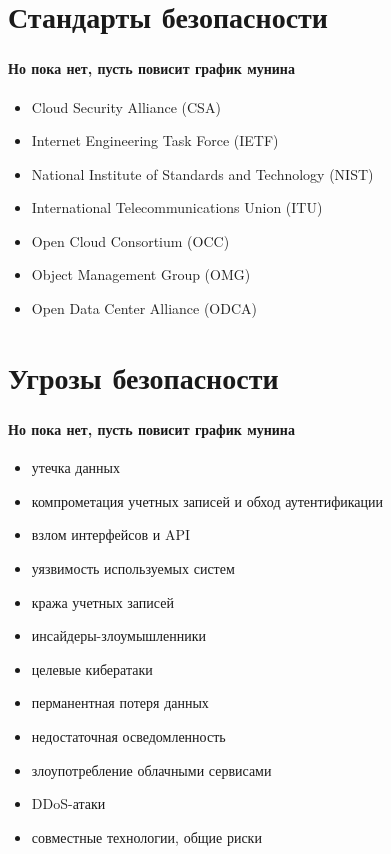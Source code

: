 
\frame[plain]{\titlepage} %


\section{Стандарты безопасности}

\begin{frame}
\frametitle{\insertsection}
\framesubtitle{Но пока нет, пусть повисит график мунина}

\begin{itemize}
    \item Cloud Security Alliance (CSA)
    \item Internet Engineering Task Force (IETF)
    \item National Institute of Standards and Technology (NIST)
    \item International Telecommunications Union (ITU)
    \item Open Cloud Consortium (OCC)
    \item Object Management Group (OMG)
    \item Open Data Center Alliance (ODCA)
\end{itemize}
\end{frame}


\section{Угрозы безопасности}

\begin{frame}
\frametitle{\insertsection}
\framesubtitle{Но пока нет, пусть повисит график мунина}

\begin{itemize}
    \item утечка данных
    \item компрометация учетных записей и обход аутентификации
    \item взлом интерфейсов и API
    \item уязвимость используемых систем
    \item кража учетных записей
    \item инсайдеры-злоумышленники
    \item целевые кибератаки
    \item перманентная потеря данных
    \item недостаточная осведомленность
    \item злоупотребление облачными сервисами
    \item DDoS-атаки
    \item совместные технологии, общие риски
\end{itemize}
\end{frame}

